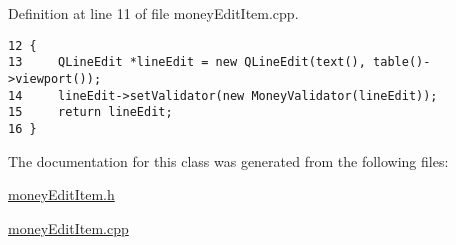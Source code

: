 Definition at line 11 of file money\-Edit\-Item.cpp.

\footnotesize\begin{verbatim}12 {
13     QLineEdit *lineEdit = new QLineEdit(text(), table()->viewport());
14     lineEdit->setValidator(new MoneyValidator(lineEdit));
15     return lineEdit;
16 }
\end{verbatim}\normalsize 




The documentation for this class was generated from the following files:\begin{CompactItemize}
\item 
\hyperlink{moneyEditItem_8h}{money\-Edit\-Item.h}\item 
\hyperlink{moneyEditItem_8cpp}{money\-Edit\-Item.cpp}\end{CompactItemize}
